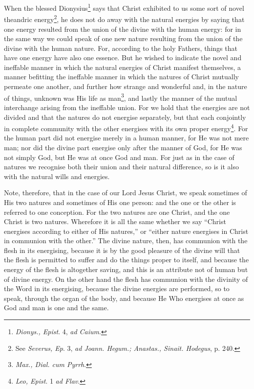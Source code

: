 When the blessed Dionysius\footnote{\emph{Dionys., Epist}. 4, \emph{ad Caium}.} says that Christ exhibited to us some sort of novel theandric energy\footnote{See \emph{Severus, Ep}. 3, \emph{ad Joann. Hegum.; Anastas., Sinait. Hodegus}, p. 240.}, he does not do away with the natural energies by saying that one energy resulted from the union of the divine with the human energy: for in the same way we could speak of one new nature resulting from the union of the divine with the human nature. For, according to the holy Fathers, things that have one energy have also one essence. But he wished to indicate the novel and ineffable manner in which the natural energies of Christ manifest themselves, a manner befitting the ineffable manner in which the natures of Christ mutually permeate one another, and further how strange and wonderful and, in the nature of things, unknown was His life as man\footnote{\emph{Max., Dial. cum Pyrrh}.}, and lastly the manner of the mutual interchange arising from the ineffable union. For we hold that the energies are not divided and that the natures do not energise separately, but that each conjointly in complete community with the other energises with its own proper energy\footnote{\emph{Leo, Epist}. 1 \emph{ad Flav}.}. For the human part did not energise merely in a human manner, for He was not mere man; nor did the divine part energise only after the manner of God, for He was not simply God, but He was at once God and man. For just as in the case of natures we recognise both their union and their natural difference, so is it also with the natural wills and energies.

Note, therefore, that in the case of our Lord Jesus Christ, we speak sometimes of His two natures and sometimes of His one person: and the one or the other is referred to one conception. For the two natures are one Christ, and the one Christ is two natures. Wherefore it is all the same whether we say “Christ energises according to either of His natures,” or “either nature energises in Christ in communion with the other.” The divine nature, then, has communion with the flesh in its energising, because it is by the good pleasure of the divine will that the flesh is permitted to suffer and do the things proper to itself, and because the energy of the flesh is altogether saving, and this is an attribute not of human but of divine energy. On the other hand the flesh has communion with the divinity of the Word in its energising, because the divine energies are performed, so to speak, through the organ of the body, and because He Who energises at once as God and man is one and the same.

